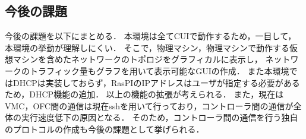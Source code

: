 \documentclass[submit,techrep]{ipsj}
\begin{document}
\subsection{今後の課題}
今後の課題を以下にまとめる．
本環境は全てCUIで動作するため，一目して，本環境の挙動が理解しにくい．
そこで，物理マシン，物理マシンで動作する仮想マシンを含めたネットワークのトポロジをグラフィカルに表示し，
ネットワークのトラフィック量もグラフを用いて表示可能なGUIの作成．
また本環境ではDHCPは実装しておらず，RasPIのIPアドレスはユーザが指定する必要があるため，DHCP機能の追加．
以上の機能の拡張が考えられる．
また，現在はVMC，OFC間の通信は現在sshを用いて行っており，コントローラ間の通信が全体の実行速度低下の原因となる．
そのため，コントローラ間の通信を行う独自のプロトコルの作成も今後の課題として挙げられる．

\end{document}
